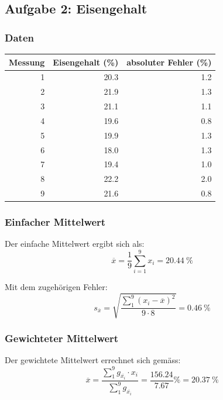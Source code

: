 \clearpage
\subsection{Aufgabe 2: Eisengehalt}

\subsubsection{Daten}
\begin{center}
\begin{tabular}{rrr}
    \toprule
    Messung & Eisengehalt (\%) & absoluter Fehler (\%) \\
    \midrule
    1 & 20.3 & 1.2 \\
    2 & 21.9 & 1.3 \\
    3 & 21.1 & 1.1 \\
    4 & 19.6 & 0.8 \\
    5 & 19.9 & 1.3 \\
    6 & 18.0 & 1.3 \\
    7 & 19.4 & 1.0 \\
    8 & 22.2 & 2.0 \\
    9 & 21.6 & 0.8 \\
    \bottomrule
\end{tabular}
\end{center}

\subsubsection{Einfacher Mittelwert}

Der einfache Mittelwert ergibt sich als:
\begin{equation*}
    \overline{x} = \frac{1}{9}\sum_{i=1}^9 x_i = \SI{20.44}{\percent}
\end{equation*}

Mit dem zugeh\"origen Fehler:
\begin{equation*}
    s_{\overline{x}} = \sqrt{\frac{\sum_1^9(x_i-\overline{x})^2}{9 \cdot 8}} = \SI{0.46}{\percent}
\end{equation*}


\subsubsection{Gewichteter Mittelwert}

Der gewichtete Mittelwert errechnet sich gem\"ass:
\begin{equation*}
    \overline{x} = \frac{\sum_1^9 g_{\overline{x_i}} \cdot x_i}{\sum_1^9 g_{\overline{x_i}}} = \frac{156.24}{7.67} \si{\percent} = \SI{20.37}{\percent}
\end{equation*}

